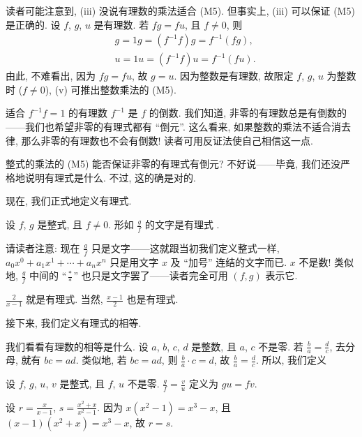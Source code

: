 读者可能注意到, (iii) 没说有理数的乘法适合 (M5). 但事实上, (iii) 可以保证 (M5) 是正确的. 设 $f$, $g$, $u$ 是有理数. 若 $fg = fu$, 且 $f \neq 0$, 则
\begin{align*}
     & g = 1g = (f^{-1} f) g = f^{-1} (fg), \\
     & u = 1u = (f^{-1} f) u = f^{-1} (fu).
\end{align*}
由此, 不难看出, 因为 $fg = fu$, 故 $g = u$. 因为整数是有理数, 故限定 $f$, $g$, $u$ 为整数时 ($f \neq 0$), (v) 可推出整数乘法的 (M5).

适合 $f^{-1} f = 1$ 的有理数 $f^{-1}$ 是 $f$ 的倒数. 我们知道, 非零的有理数总是有倒数的——我们也希望非零的有理式都有 ``倒元''. 这么看来, 如果整数的乘法不适合消去律, 那么非零的有理数也不会有倒数! 读者可用反证法使自己相信这一点.

整式的乘法的 (M5) 能否保证非零的有理式有倒元? 不好说——毕竟, 我们还没严格地说明有理式是什么. 不过, 这的确是对的.

现在, 我们正式地定义有理式.

\begin{definition}
    设 $f$, $g$ 是整式, 且 $f \neq 0$. 形如 $\frac{g}{f}$ 的文字是有理式 .
\end{definition}

\begin{remark}
    请读者注意: 现在 $\frac{g}{f}$ 只是文字——这就跟当初我们定义整式一样, $a_0 x^0 + a_1 x^1 + \cdots + a_n x^n$ 只是用文字 $x$ 及 ``加号'' 连结的文字而已. $x$ 不是数! 类似地, $\frac{g}{f}$ 中间的 ``$\frac{\ast}{\ast}$'' 也只是文字罢了——读者完全可用 $(f,g)$ 表示它.
\end{remark}

\begin{example}
    $\frac{2}{x-1}$ 就是有理式. 当然, $\frac{x-1}{2}$ 也是有理式.
\end{example}

接下来, 我们定义有理式的相等.

我们看看有理数的相等是什么. 设 $a$, $b$, $c$, $d$ 是整数, 且 $a$, $c$ 不是零. 若 $\frac{b}{a} = \frac{d}{c}$, 去分母, 就有 $bc = ad$. 类似地, 若 $bc = ad$, 则 $\frac{b}{a} \cdot c = d$, 故 $\frac{b}{a} = \frac{d}{c}$. 所以, 我们定义
\begin{definition}
    设 $f$, $g$, $u$, $v$ 是整式, 且 $f$, $u$ 不是零. $\frac{g}{f} = \frac{v}{u}$ 定义为 $gu = fv$.
\end{definition}

\begin{example}
    设 $r = \frac{x}{x - 1}$, $s = \frac{x^2 + x}{x^2 - 1}$. 因为 $x(x^2 - 1) = x^3 - x$, 且 $(x - 1)(x^2 + x) = x^3 - x$, 故 $r = s$.
\end{example}

